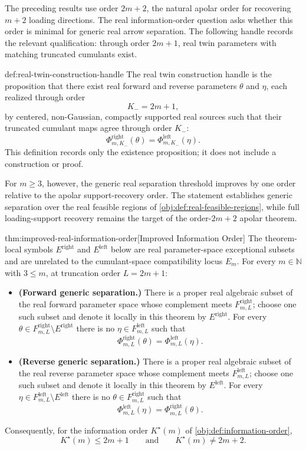 \documentclass[11pt]{article}
\begin{document}
The preceding results use order \(2m+2\), the natural apolar order for recovering \(m+2\) loading directions. The real information-order question asks whether this order is minimal for generic real arrow separation. The following handle records the relevant qualification: through order \(2m+1\), real twin parameters with matching truncated cumulants exist.

\begin{definitionv}{def:real-twin-construction-handle}
The real twin construction handle is the proposition that there exist real forward and reverse parameters \(\theta\) and \(\eta\), each realized through order
\[
K_-=2m+1,
\]
by centered, non-Gaussian, compactly supported real sources
such that their truncated cumulant maps agree through order \(K_-\):
\[
\Phi^{\mathrm{right}}_{m,K_-}(\theta)=\Phi^{\mathrm{left}}_{m,K_-}(\eta).
\]
This definition records only the existence proposition; it does not include a construction or proof.
\end{definitionv}

For \(m\ge3\), however, the generic real separation threshold improves by one order relative to the apolar support-recovery order. The statement establishes generic separation over the real feasible regions of \cref{obj:def:real-feasible-regions}, while full loading-support recovery remains the target of the order-\(2m+2\) apolar theorem.

\begin{theoremv}{thm:improved-real-information-order}[Improved Information Order]
The theorem-local symbols \(E^{\mathrm{right}}\) and \(E^{\mathrm{left}}\) below are real parameter-space exceptional subsets and are unrelated to the cumulant-space compatibility locus \(E_m\). For every \(m\in\mathbb N\) with \(3\le m\), at truncation order \(L=2m+1\):
\begin{itemize}
\item \textbf{(Forward generic separation.)} There is a proper real algebraic subset of the real forward parameter space whose complement meets \(F^{\mathrm{right}}_{m,L}\); choose one such subset and denote it locally in this theorem by \(E^{\mathrm{right}}\). For every \(\theta\in F^{\mathrm{right}}_{m,L}\setminus E^{\mathrm{right}}\) there is no \(\eta\in F^{\mathrm{left}}_{m,L}\) such that
\[
\Phi^{\mathrm{right}}_{m,L}(\theta)=\Phi^{\mathrm{left}}_{m,L}(\eta).
\]
\item \textbf{(Reverse generic separation.)} There is a proper real algebraic subset of the real reverse parameter space whose complement meets \(F^{\mathrm{left}}_{m,L}\); choose one such subset and denote it locally in this theorem by \(E^{\mathrm{left}}\). For every \(\eta\in F^{\mathrm{left}}_{m,L}\setminus E^{\mathrm{left}}\) there is no \(\theta\in F^{\mathrm{right}}_{m,L}\) such that
\[
\Phi^{\mathrm{left}}_{m,L}(\eta)=\Phi^{\mathrm{right}}_{m,L}(\theta).
\]
\end{itemize}
Consequently, for the information order \(K^\star(m)\) of \cref{obj:def:information-order},
\[
K^\star(m)\le 2m+1
\qquad\text{and}\qquad
K^\star(m)\ne 2m+2 .
\]
\end{theoremv}
\end{document}
